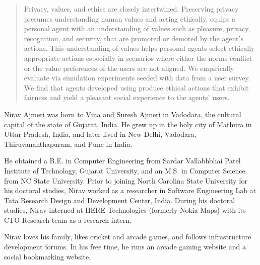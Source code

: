 \begin{abstract}
Privacy, values, and ethics are closely intertwined. Preserving privacy presumes  understanding human values and acting ethically. \frameworkAinur equips a personal agent with an understanding of values such as pleasure, privacy, recognition, and security, that are promoted or demoted by the agent's actions. This understanding of values helps personal agents  select ethically appropriate actions especially in scenarios where either the norms conflict or the value preferences of the users are not aligned.  We empirically evaluate \frameworkAinur via simulation experiments seeded with data from a user survey. We find that agents developed using \frameworkAinur produce ethical actions that exhibit fairness and yield a pleasant social experience to the agents' users.
\end{abstract}


\makecopyrightpage

\maketitlepage

\begin{dedication}
  \centering 
\end{dedication}

\begin{biography}
Nirav Ajmeri was born to Vina and Suresh Ajmeri in Vadodara, the cultural capital of the state of Gujarat, India. He grew up in the holy city of Mathura in Uttar Pradesh, India, and later lived in New Delhi, Vadodara, Thiruvananthapuram, and Pune in India. 

He obtained a B.E. in Computer Engineering from Sardar Vallabhbhai Patel Institute of Technology, Gujarat University, 
and an M.S. in Computer Science from NC State University. 
Prior to joining North Carolina State University for his doctoral studies, Nirav worked as a researcher in Software Engineering Lab at Tata Research Design and Development Center, India. During his doctoral studies, Nirav interned at HERE Technologies (formerly Nokia Maps) with its CTO Research team as a research intern. 

Nirav loves his family, likes cricket and arcade games, and follows infrastructure development forums. 
In his free time, he runs an arcade gaming website and a social bookmarking website. 
\end{biography}

